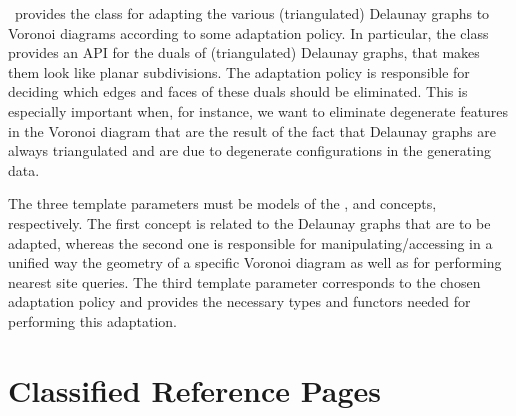 

\label{ref-chapter-vda2}


\cgal\ provides the class  for
adapting the various (triangulated) Delaunay graphs to Voronoi
diagrams according to some adaptation policy.
In particular, the class 
provides an API for the duals of (triangulated) Delaunay graphs, that
makes them look like planar subdivisions. The adaptation policy is
responsible for deciding which edges and faces of these duals should
be eliminated. This is especially important when, for instance, we
want to eliminate degenerate features in the Voronoi diagram that are
the result of the fact that Delaunay graphs are always triangulated
and are due to degenerate configurations in the generating data.

The three template parameters must be models of the
,  and
 concepts, respectively.
The first concept is related to the Delaunay graphs that are to be
adapted, whereas the second one is responsible for
manipulating/accessing in a unified way the geometry of a specific
Voronoi diagram as well as for performing nearest site queries. 
The third template parameter corresponds to the chosen adaptation
policy and provides the necessary types and functors needed for
performing this adaptation.

\section{Classified Reference Pages}

\\
\\

